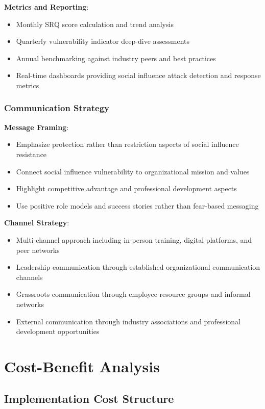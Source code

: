 \documentclass[11pt,a4paper]{article}
\begin{document}
\textbf{Metrics and Reporting}:
\begin{itemize}
\item Monthly SRQ score calculation and trend analysis
\item Quarterly vulnerability indicator deep-dive assessments
\item Annual benchmarking against industry peers and best practices
\item Real-time dashboards providing social influence attack detection and response metrics
\end{itemize}

\subsubsection{Communication Strategy}

\textbf{Message Framing}:
\begin{itemize}
\item Emphasize protection rather than restriction aspects of social influence resistance
\item Connect social influence vulnerability to organizational mission and values
\item Highlight competitive advantage and professional development aspects
\item Use positive role models and success stories rather than fear-based messaging
\end{itemize}

\textbf{Channel Strategy}:
\begin{itemize}
\item Multi-channel approach including in-person training, digital platforms, and peer networks
\item Leadership communication through established organizational communication channels
\item Grassroots communication through employee resource groups and informal networks
\item External communication through industry associations and professional development opportunities
\end{itemize}

\section{Cost-Benefit Analysis}

\subsection{Implementation Cost Structure}
\end{document}
